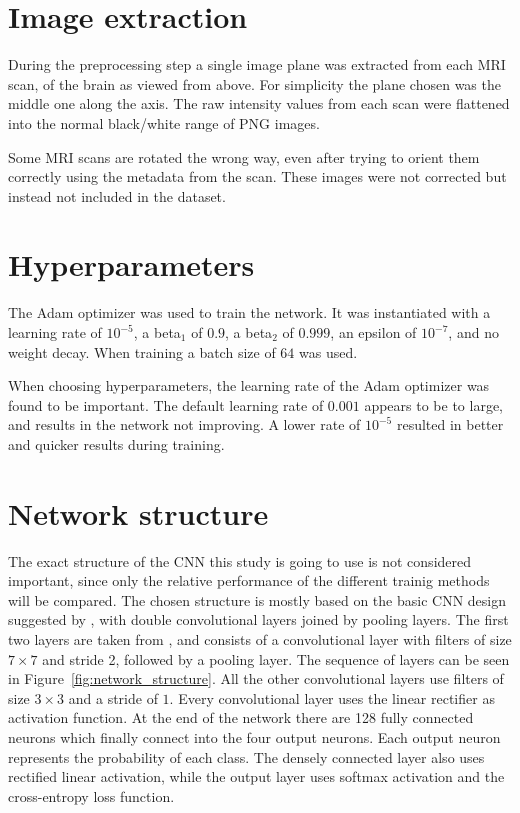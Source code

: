 \documentclass{kththesis}
\begin{document}
\begin{minipage}{.7\linewidth}
\vspace*{-30mm}
\section{Image extraction} \label{image_extraction}
During the preprocessing step a single image plane was extracted from each MRI scan, of the brain as viewed from above. For simplicity the plane chosen was the middle one along the axis. The raw intensity values from each scan were flattened into the normal black/white range of PNG images.

Some MRI scans are rotated the wrong way, even after trying to orient them correctly using the metadata from the scan. These images were not corrected but instead not included in the dataset.

\section{Hyperparameters}
The Adam optimizer was used to train the network. It was instantiated with a learning rate of $10^{-5}$, a beta$_1$ of $0.9$, a beta$_2$ of $0.999$, an epsilon of $10^{-7}$, and no weight decay. When training a batch size of $64$ was used.

When choosing hyperparameters, the learning rate of the Adam optimizer was found to be important. The default learning rate of $0.001$ appears to be to large, and results in the network not improving. A lower rate of $10^{-5}$ resulted in better and quicker results during training.

\section{Network structure} \label{network_structure}
The exact structure of the CNN this study is going to use is not considered important, since only the relative performance of the different trainig methods will be compared. The chosen structure is mostly based on the basic CNN design suggested by \textcite{cnnIntro}, with double convolutional layers joined by pooling layers. The first two layers are taken from \textcite{islam2018early}, and consists of a convolutional layer with filters of size $7 \times 7$ and stride 2, followed by a pooling layer. The sequence of layers can be seen in Figure~\ref{fig:network_structure}. All the other convolutional layers use filters of size $3 \times 3$ and a stride of $1$. Every convolutional layer uses the linear rectifier as activation function. At the end of the network there are 128 fully connected neurons which finally connect into the four output neurons. Each output neuron represents the probability of each class. The densely connected layer also uses rectified linear activation, while the output layer uses softmax activation and the cross-entropy loss function.

\end{minipage}
\end{document}
